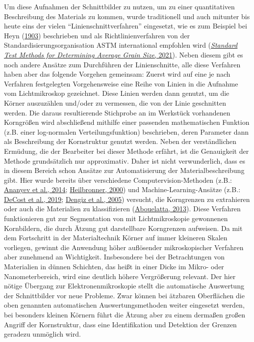 \documentclass[
  12pt,
  openany]{book}
\begin{document}
Um diese Aufnahmen der Schnittbilder zu nutzen, um zu einer quantitativen Beschreibung des Materials zu kommen, wurde traditionell und auch mitunter bis heute eins der vielen ``Linienschnittverfahren'' eingesetzt, wie es zum Beispiel bei Heyn (\protect\hyperlink{ref-heynShortReportsMetallurgical1903}{1903}) beschrieben und als Richtlinienverfahren von der Standardisierungsorganisation ASTM international empfohlen wird (\protect\hyperlink{ref-StandardTestMethods2021}{\emph{Standard {Test Methods} for {Determining Average Grain Size}}, 2021}).
Neben diesem gibt es noch andere Ansätze zum Durchführen der Linienschnitte, alle diese Verfahren haben aber das folgende Vorgehen gemeinsam:
Zuerst wird auf eine je nach Verfahren festgelegten Vorgehensweise eine Reihe von Linien in die Aufnahme vom Lichtmikroskop gezeichnet. Diese Linien werden dann genutzt, um die Körner auszuzählen und/oder zu vermessen, die von der Linie geschnitten werden.
Die daraus resultierende Stichprobe an im Werkstück vorhandenen Korngrößen wird abschließend mithilfe einer passenden mathematischen Funktion (z.B. einer log-normalen Verteilungsfunktion) beschrieben, deren Parameter dann als Beschreibung der Kornstruktur genutzt werden.\newline
Neben der verständlichen Ermüdung, die der Bearbeiter bei dieser Methode erfährt, ist die Genauigkeit der Methode grundsätzlich nur approximativ. Daher ist nicht verwunderlich, dass es in diesem Bereich schon Ansätze zur Automatisierung der Materialbeschreibung gibt.
Hier wurde bereits über verschiedene Computervision-Methoden (z.B.: \protect\hyperlink{ref-ananyevCuGdCodoped2014}{Ananyev et al., 2014}; \protect\hyperlink{ref-heilbronnerAutomaticGrainBoundary2000}{Heilbronner, 2000}) und Machine-Learning-Ansätze (z.B.: \protect\hyperlink{ref-decostHighThroughputQuantitative2019}{DeCost et al., 2019}; \protect\hyperlink{ref-dengizGrainBoundaryDetection2005}{Dengiz et al., 2005}) versucht, die Korngrenzen zu extrahieren oder auch die Materialien zu klassifizieren (\protect\hyperlink{ref-abouelattaClassificationCopperAlloys2013}{Abouelatta, 2013}).\newline
Diese Verfahren funktionieren gut zur Segmentation von mit Lichtmikroskopie gewonnenen Kornbildern, die durch Ätzung gut darstellbare Korngrenzen aufweisen.
Da mit dem Fortschritt in der Materialtechnik Körner auf immer kleineren Skalen vorliegen, gewinnt die Anwendung höher auflösender mikroskopischer Verfahren aber zunehmend an Wichtigkeit. Insbesondere bei der Betrachtungen von Materialien in dünnen Schichten, das heißt in einer Dicke im Mikro- oder Nanometerbereich, wird eine deutlich höhere Vergrößerung relevant. Der hier nötige Übergang zur Elektronenmikroskopie stellt die automatische Auswertung der Schnittbilder vor neue Probleme. Zwar können bei ätzbaren Oberflächen die oben genannten automatischen Auswertungsmethoden weiter eingesetzt werden, bei besonders kleinen Körnern führt die Ätzung aber zu einem dermaßen großen Angriff der Kornstruktur, dass eine Identifikation und Detektion der Grenzen geradezu unmöglich wird.
\end{document}
